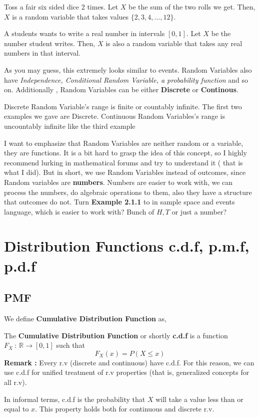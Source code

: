 \begin{example}
    Toss a fair six sided dice 2 times. Let $X$ be the sum of the two rolls we get. Then, $X$ is a random variable that takes values $\{2,3,4,...,12\}$.
\end{example}

\begin{example}
    A students wants to write a real number in intervals $[0,1]$. Let $X$ be the number student writes. Then, $X$ is also a random variable that takes any real numbers in that interval.
\end{example}

As you may guess, this extremely looks similar to events. Random Variables also have \textit{Independence, Conditional Random Variable, a probability function} and so on. Additionally , Random Variables can be either \textbf{Discrete} or \textbf{Continous}.
\par 
Discrete Random Variable's range is finite or countably infinite. The first two examples we gave are Discrete. Continuous Random Variables's range is uncountably infinite like the third example \newline

I want to emphasize  that Random Variables are neither random or a variable, they are functions. It is a bit hard to grasp the idea of this concept, so I highly recommend lurking in mathematical forums and try to understand it ( that is what I did). But in short, we use Random Variables instead of outcomes, since Random variables are \textbf{numbers}. Numbers are easier to work with, we can process the numbers, do algebraic operations to them, also they have a structure that outcomes do not.
Turn \textbf{ Example 2.1.1} to in sample space and events language, which is easier to work with? Bunch of $H,T$ or just a number?





\section{Distribution Functions c.d.f, p.m.f, p.d.f}
\subsection*{PMF}
We define  \textbf{Cumulative Distribution Function} as,

\begin{definition}
    The \textbf{Cumulative Distribution Function} or shortly \textbf{c.d.f} is a function $F_X \ : \ \mathbb{R} \rightarrow [0,1]$ such that
    \[ F_X(x) = P( X \le x) \]
    \textbf{Remark :} Every r.v (discrete and continuous) have c.d.f. For this reason, we can use c.d.f for unified treatment of r.v properties (that is, generalized concepts for all r.v).
\end{definition}
\par
In informal terms, c.d.f is the probability that $X$ will take a value less than or equal to $x$. This property holds both for continuous and discrete r.v.
\par 

